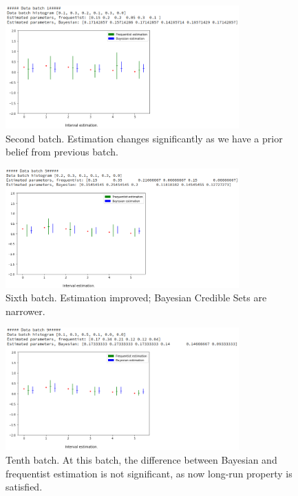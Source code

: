 \documentclass[12pt]{article}
\theoremstyle{definition}
\begin{document}
\begin{figure}[H]
  \centering
  \includegraphics[width=0.8\textwidth,keepaspectratio]{figures/ex1_2.png}
  \caption{Second batch. Estimation changes significantly as we have a prior
    belief from previous batch.}
\end{figure}

\begin{figure}[H]
  \centering
  \includegraphics[width=0.8\textwidth,keepaspectratio]{figures/ex1_3.png}
  \caption{Sixth batch. Estimation improved; Bayesian Credible Sets are narrower.}
\end{figure}

\begin{figure}[H]
  \centering
  \includegraphics[width=0.8\textwidth,keepaspectratio]{figures/ex1_4.png}
  \caption{Tenth batch. At this batch, the difference between Bayesian and
    frequentist estimation is not significant, as now long-run property is satisfied.}
\end{figure}
\end{document}
